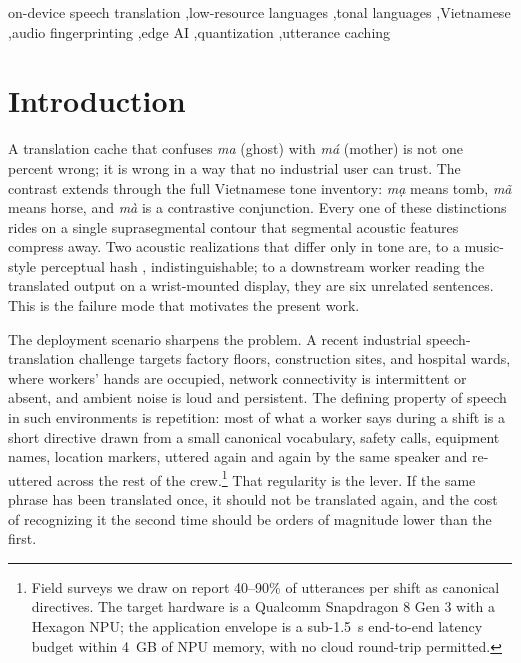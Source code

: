 \documentclass[a4paper,fleqn]{cas-dc}
\begin{document}
\begin{keywords}
on-device speech translation \sep low-resource languages \sep tonal languages \sep Vietnamese \sep audio fingerprinting \sep edge AI \sep quantization \sep utterance caching
\end{keywords}

\maketitle

\section{Introduction}\label{sec:intro}

A translation cache that confuses \emph{ma} (ghost) with \emph{m\'a} (mother) is not one percent wrong; it is wrong in a way that no industrial user can trust. The contrast extends through the full Vietnamese tone inventory: \emph{m\d{a}} means tomb, \emph{m\~a} means horse, and \emph{m\`a} is a contrastive conjunction. Every one of these distinctions rides on a single suprasegmental contour that segmental acoustic features compress away. Two acoustic realizations that differ only in tone are, to a music-style perceptual hash \citep{wang2003shazam}, indistinguishable; to a downstream worker reading the translated output on a wrist-mounted display, they are six unrelated sentences. This is the failure mode that motivates the present work.

The deployment scenario sharpens the problem. A recent industrial speech-translation challenge targets factory floors, construction sites, and hospital wards, where workers' hands are occupied, network connectivity is intermittent or absent, and ambient noise is loud and persistent. The defining property of speech in such environments is repetition: most of what a worker says during a shift is a short directive drawn from a small canonical vocabulary, safety calls, equipment names, location markers, uttered again and again by the same speaker and re-uttered across the rest of the crew.\footnote{Field surveys we draw on report 40--90\% of utterances per shift as canonical directives. The target hardware is a Qualcomm Snapdragon 8 Gen 3 with a Hexagon NPU; the application envelope is a sub-1.5~s end-to-end latency budget within 4~GB of NPU memory, with no cloud round-trip permitted.} That regularity is the lever. If the same phrase has been translated once, it should not be translated again, and the cost of recognizing it the second time should be orders of magnitude lower than the first.
\end{document}
